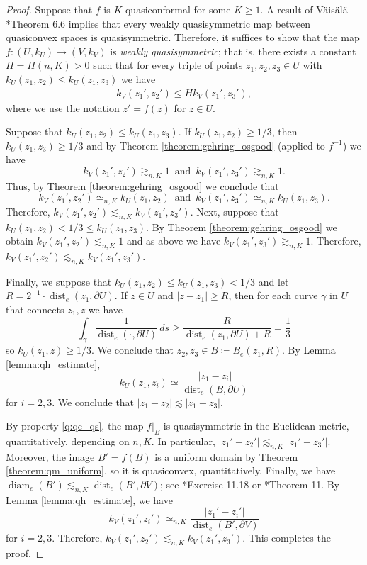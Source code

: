 \documentclass[letterpaper]{amsart}
\theoremstyle{plain}
\theoremstyle{definition}
\theoremstyle{remark}
\numberwithin{equation}{section}
\numberwithin{theorem}{section}
\DeclareMathOperator{\dist}{dist}
\DeclareMathOperator{\diam}{diam}
\begin{document}
\begin{proof}
Suppose that $f$ is $K$-quasiconformal for some $K\geq 1$. A result of V\"ais\"al\"a \cite{Vaisala:free_quasiworld}*{Theorem 6.6} implies that every weakly quasisymmetric map between quasiconvex spaces is quasisymmetric. Therefore, it suffices to show that the map $f\colon (U,k_U)\to (V,k_V)$ is \textit{weakly quasisymmetric}; that is, there exists a constant $H=H(n,K)>0$ such that for every triple of points $z_1,z_2,z_3\in U$ with $k_U(z_1,z_2)\leq k_U(z_1,z_3)$ we have
\begin{align*}
k_V(z_1',z_2')\leq H k_V(z_1',z_3'),
\end{align*}
where we use the notation $z'=f(z)$ for $z\in U$.

Suppose that $k_U(z_1,z_2)\leq k_U(z_1,z_3)$. If $k_U(z_1,z_2)\geq 1/3$, then $k_U(z_1,z_3)\geq 1/3$ and by Theorem \ref{theorem:gehring_osgood} (applied to $f^{-1}$) we have 
$$k_{V}(z_1',z_2')\gtrsim_{n,K} 1\,\,\, \text{and}\,\,\,k_{V}(z_1',z_3')\gtrsim_{n,K} 1.$$
Thus, by Theorem \ref{theorem:gehring_osgood} we conclude that 
$$k_{V}(z_1',z_2')\simeq_{n,K} k_U(z_1,z_2)\,\,\, \text{and}\,\,\,k_{V}(z_1',z_3')\simeq_{n,K} k_U(z_1,z_3).$$
Therefore, $k_V(z_1',z_2')\lesssim_{n,K} k_V(z_1',z_3')$. Next, suppose that $k_U(z_1,z_2)< 1/3\leq k_U(z_1,z_3)$. By Theorem \ref{theorem:gehring_osgood} we obtain $k_V(z_1',z_2')\lesssim_{n,K} 1$ and as above we have $k_V(z_1',z_3')\gtrsim_{n,K}1$. Therefore, $k_V(z_1',z_2')\lesssim_{n,K} k_V(z_1',z_3')$.

Finally, we suppose that $k_U(z_1,z_2)\leq k_U(z_1,z_3)< 1/3$ and let $R=2^{-1}\cdot \dist_e(z_1,\partial U)$. If $z\in U$ and $|z-z_1|\geq R$, then for each curve $\gamma$ in $U$ that connects $z_1,z$ we have
$$ \int_{\gamma} \frac{1}{\dist_e(\cdot,\partial U)}\, ds \geq  \frac{R}{\dist_e(z_1,\partial U)+R}=\frac{1}{3}$$
so $k_U(z_1,z) \geq 1/3$. We conclude that $z_2,z_3\in B\coloneqq B_e(z_1,R)$. By Lemma \ref{lemma:qh_estimate},
$$k_U(z_1,z_i) \simeq \frac{|z_1-z_i|}{\dist_e(B,\partial U)}$$
for $i=2,3$. We conclude that $|z_1-z_2|\lesssim |z_1-z_3|$.

By property \ref{q:qc_qs}, the map $f|_{B}$ is quasisymmetric in the Euclidean metric, quantitatively, depending on $n,K$. In particular, $|z_1'-z_2'|\lesssim_{n,K} |z_1'-z_3'|$. Moreover, the image $B'=f(B)$ is a uniform domain by Theorem \ref{theorem:qm_uniform}, so it is quasiconvex, quantitatively. Finally, we have $\diam_e( B')\lesssim_{n,K} \dist_e(B',\partial V)$; see \cite{Heinonen:metric}*{Exercise 11.18} or \cite{Gehring:Rings}*{Theorem 11}. By Lemma \ref{lemma:qh_estimate}, we have
$$k_V(z_1',z_i') \simeq_{n,K} \frac{|z_1'-z_i'|}{\dist_e(B',\partial V)}$$
for $i=2,3$. Therefore, $k_{V}(z_1',z_2')\lesssim_{n,K} k_{V}(z_1',z_3')$. This completes the proof.
\end{proof}
\end{document}
